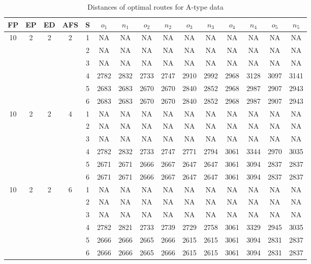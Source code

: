 \begin{longtable}{|c|c|c|c|c|c c|c c|c c|c c|c c|}
\caption{Distances of optimal routes for A-type data}
\label{tab:distance_a} \\
\hline
FP  & EP & ED & AFS & S & $o_1$ & $n_1$ & $o_2$ & $n_2$ & $o_3$ & $n_3$ & $o_4$ & $n_4$ & $o_5$ & $n_5$\\
\hline\hline\multirow{6}{*}{10} & \multirow{6}{*}{2} & \multirow{6}{*}{2} & \multirow{6}{*}{2} & 1 & NA & NA & NA & NA & NA & NA & NA & NA & NA & NA \\
 & & & & 2 & NA & NA & NA & NA & NA & NA & NA & NA & NA & NA \\
 & & & & 3 & NA & NA & NA & NA & NA & NA & NA & NA & NA & NA \\
 & & & & 4 & 2782 & 2832 & 2733 & 2747 & 2910 & 2992 & 2968 & 3128 & 3097 & 3141 \\
 & & & & 5 & 2683 & 2683 & 2670 & 2670 & 2840 & 2852 & 2968 & 2987 & 2907 & 2943 \\
 & & & & 6 & 2683 & 2683 & 2670 & 2670 & 2840 & 2852 & 2968 & 2987 & 2907 & 2943 \\
\hline
\multirow{6}{*}{10} & \multirow{6}{*}{2} & \multirow{6}{*}{2} & \multirow{6}{*}{4} & 1 & NA & NA & NA & NA & NA & NA & NA & NA & NA & NA \\
 & & & & 2 & NA & NA & NA & NA & NA & NA & NA & NA & NA & NA \\
 & & & & 3 & NA & NA & NA & NA & NA & NA & NA & NA & NA & NA \\
 & & & & 4 & 2782 & 2832 & 2733 & 2747 & 2771 & 2794 & 3061 & 3344 & 2970 & 3035 \\
 & & & & 5 & 2671 & 2671 & 2666 & 2667 & 2647 & 2647 & 3061 & 3094 & 2837 & 2837 \\
 & & & & 6 & 2671 & 2671 & 2666 & 2667 & 2647 & 2647 & 3061 & 3094 & 2837 & 2837 \\
\hline
\multirow{6}{*}{10} & \multirow{6}{*}{2} & \multirow{6}{*}{2} & \multirow{6}{*}{6} & 1 & NA & NA & NA & NA & NA & NA & NA & NA & NA & NA \\
 & & & & 2 & NA & NA & NA & NA & NA & NA & NA & NA & NA & NA \\
 & & & & 3 & NA & NA & NA & NA & NA & NA & NA & NA & NA & NA \\
 & & & & 4 & 2782 & 2821 & 2733 & 2739 & 2729 & 2758 & 3061 & 3329 & 2945 & 3035 \\
 & & & & 5 & 2666 & 2666 & 2665 & 2666 & 2615 & 2615 & 3061 & 3094 & 2831 & 2837 \\
 & & & & 6 & 2666 & 2666 & 2665 & 2666 & 2615 & 2615 & 3061 & 3094 & 2831 & 2837 \\

\end{longtable}
